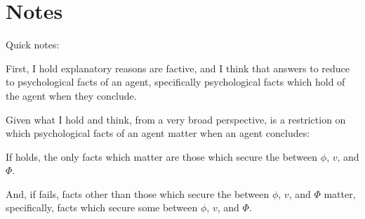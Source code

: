 \section*{Notes}


\begin{note}
  Quick notes:

  First, I hold explanatory reasons are factive, and I think that answers to \qWhy{} reduce to psychological facts of an agent, specifically psychological facts which hold of the agent when they conclude.%


  Given what I hold and think, from a very broad perspective, \issueInclusion{} is a restriction on which psychological facts of an agent matter when an agent concludes:

  If \issueInclusion{} holds, the only facts which matter are those which secure the \ros{} between \(\phi\), \(v\), and \(\Phi\).

  And, if \issueInclusion{} fails, facts other than those which secure the \ros{} between \(\phi\), \(v\), and \(\Phi\) matter, specifically, facts which secure some \ros{} between \(\phi\), \(v\), and \(\Phi\).
\end{note}



